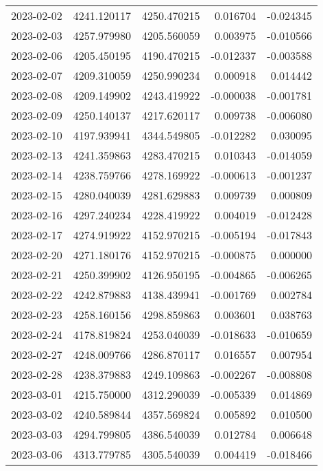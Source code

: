 \begin{tabular}{lrrrr}
2023-02-02 & 4241.120117 & 4250.470215 &        0.016704 &    -0.024345 \\
2023-02-03 & 4257.979980 & 4205.560059 &        0.003975 &    -0.010566 \\
2023-02-06 & 4205.450195 & 4190.470215 &       -0.012337 &    -0.003588 \\
2023-02-07 & 4209.310059 & 4250.990234 &        0.000918 &     0.014442 \\
2023-02-08 & 4209.149902 & 4243.419922 &       -0.000038 &    -0.001781 \\
2023-02-09 & 4250.140137 & 4217.620117 &        0.009738 &    -0.006080 \\
2023-02-10 & 4197.939941 & 4344.549805 &       -0.012282 &     0.030095 \\
2023-02-13 & 4241.359863 & 4283.470215 &        0.010343 &    -0.014059 \\
2023-02-14 & 4238.759766 & 4278.169922 &       -0.000613 &    -0.001237 \\
2023-02-15 & 4280.040039 & 4281.629883 &        0.009739 &     0.000809 \\
2023-02-16 & 4297.240234 & 4228.419922 &        0.004019 &    -0.012428 \\
2023-02-17 & 4274.919922 & 4152.970215 &       -0.005194 &    -0.017843 \\
2023-02-20 & 4271.180176 & 4152.970215 &       -0.000875 &     0.000000 \\
2023-02-21 & 4250.399902 & 4126.950195 &       -0.004865 &    -0.006265 \\
2023-02-22 & 4242.879883 & 4138.439941 &       -0.001769 &     0.002784 \\
2023-02-23 & 4258.160156 & 4298.859863 &        0.003601 &     0.038763 \\
2023-02-24 & 4178.819824 & 4253.040039 &       -0.018633 &    -0.010659 \\
2023-02-27 & 4248.009766 & 4286.870117 &        0.016557 &     0.007954 \\
2023-02-28 & 4238.379883 & 4249.109863 &       -0.002267 &    -0.008808 \\
2023-03-01 & 4215.750000 & 4312.290039 &       -0.005339 &     0.014869 \\
2023-03-02 & 4240.589844 & 4357.569824 &        0.005892 &     0.010500 \\
2023-03-03 & 4294.799805 & 4386.540039 &        0.012784 &     0.006648 \\
2023-03-06 & 4313.779785 & 4305.540039 &        0.004419 &    -0.018466 \\

\end{tabular}
